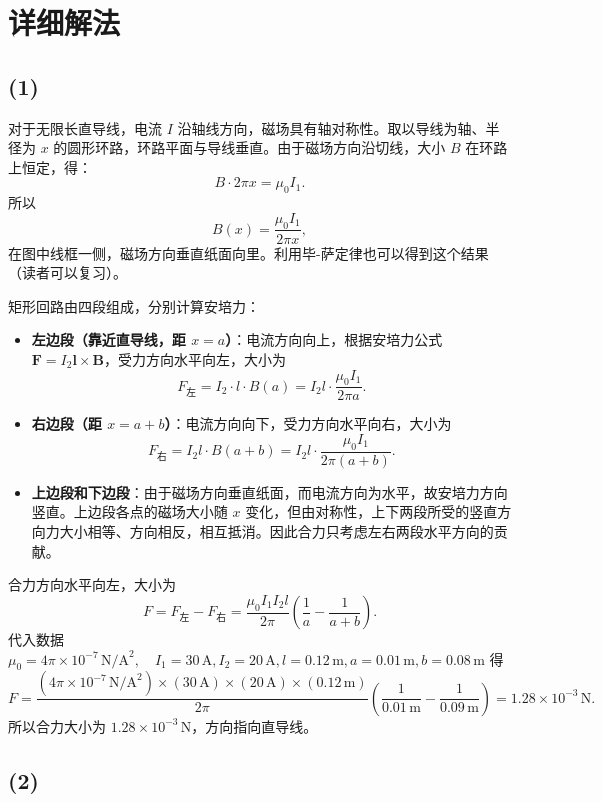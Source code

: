 \documentclass[11pt,a4paper]{ctexart}
\begin{document}
\section*{详细解法}

\subsection*{(1) }

对于无限长直导线，电流 \(I\) 沿轴线方向，磁场具有轴对称性。取以导线为轴、半径为 \(x\) 的圆形环路，环路平面与导线垂直。由于磁场方向沿切线，大小 \(B\) 在环路上恒定，得：
\[
B \cdot 2\pi x = \mu_0 I_1 .
\]
所以
\[
B(x) = \frac{\mu_0 I_1}{2\pi x},
\]
在图中线框一侧，磁场方向垂直纸面向里。利用毕-萨定律也可以得到这个结果（读者可以复习）。

矩形回路由四段组成，分别计算安培力：

\begin{itemize}
\item \textbf{左边段（靠近直导线，距 $x=a$）}：电流方向向上，根据安培力公式 $\boldsymbol{F}=I_2 \boldsymbol{l} \times \boldsymbol{B}$，受力方向水平向左，大小为
\[
F_{\text{左}} = I_2 \cdot l \cdot B(a) = I_2 l \cdot \frac{\mu_0 I_1}{2\pi a}.
\]

\item \textbf{右边段（距 $x=a+b$）}：电流方向向下，受力方向水平向右，大小为
\[
F_{\text{右}} = I_2 l \cdot B(a+b) = I_2 l \cdot \frac{\mu_0 I_1}{2\pi (a+b)}.
\]

\item \textbf{上边段和下边段}：由于磁场方向垂直纸面，而电流方向为水平，故安培力方向竖直。上边段各点的磁场大小随 $x$ 变化，但由对称性，上下两段所受的竖直方向力大小相等、方向相反，相互抵消。因此合力只考虑左右两段水平方向的贡献。
\end{itemize}
合力方向水平向左，大小为
\[
F = F_{\text{左}} - F_{\text{右}} = \frac{\mu_0 I_1 I_2 l}{2\pi} \left( \frac{1}{a} - \frac{1}{a+b} \right).
\]
代入数据
$
\mu_0 = 4\pi \times 10^{-7}\,\text{N/A}^2,\quad
I_1 = 30\,\text{A},
I_2 = 20\,\text{A},
l = 0.12\,\text{m},
a = 0.01\,\text{m},
b = 0.08\,\text{m}
$
得
\[
F = \frac{(4\pi \times 10^{-7}\,\text{N/A}^2) \times (30\,\text{A}) \times (20\,\text{A}) \times (0.12\,\text{m})}{2\pi} \left( \frac{1}{0.01\,\text{m}} - \frac{1}{0.09\,\text{m}} \right) = 1.28 \times 10^{-3}\,\text{N}.
\]
所以合力大小为 $1.28\times10^{-3}\,\text{N}$，方向指向直导线。

\subsection*{(2) }
\end{document}
